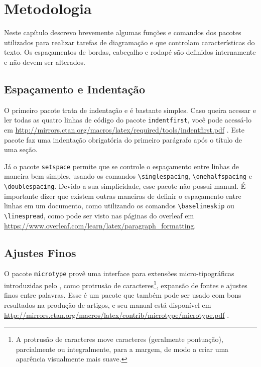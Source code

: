 \chapter{Metodologia}\label{cap:metodologia}

Neste capítulo descrevo brevemente algumas funções e comandos dos pacotes utilizados para realizar tarefas de diagramação e que controlam características do texto. Os espaçamentos de bordas, cabeçalho e rodapé são definidos internamente e não devem ser alterados.

\section{Espaçamento e Indentação}

O primeiro pacote trata de indentação e é bastante simples. Caso queira acessar e ler todas as quatro linhas de código do pacote \texttt{indentfirst}, você pode acessá-lo em \url{http://mirrors.ctan.org/macros/latex/required/tools/indentfirst.pdf} \parencite{indentfirst}. Este pacote faz uma indentação obrigatória do primeiro parágrafo após o título de uma seção.

Já o pacote \texttt{setspace} permite que se controle o espaçamento entre linhas de maneira bem simples, usando os comandos \texttt{\textbackslash singlespacing}, \texttt{\textbackslash onehalfspacing} e \texttt{\textbackslash doublespacing}. Devido a sua simplicidade, esse pacote não possui manual. É importante dizer que existem outras maneiras de definir o espaçamento entre linhas em um documento, como utilizando os comandos \texttt{\textbackslash baselineskip} ou \texttt{\textbackslash linespread}, como pode ser visto nas páginas do \gls{overleaf} em \url{https://www.overleaf.com/learn/latex/paragraph_formatting}.

\section{Ajustes Finos}
O pacote \texttt{microtype} provê uma interface para extensões micro-tipográficas introduzidas pelo , como protrusão de caracteres\footnote{A protrusão de caracteres move caracteres (geralmente pontuação), parcialmente ou integralmente, para a margem, de modo a criar uma aparência visualmente mais suave.}, expansão de fontes e ajustes finos entre palavras. Esse é um pacote que também pode ser usado com bons resultados na produção de artigos, e seu manual está disponível em \url{http://mirrors.ctan.org/macros/latex/contrib/microtype/microtype.pdf} \parencite{microtype}.

